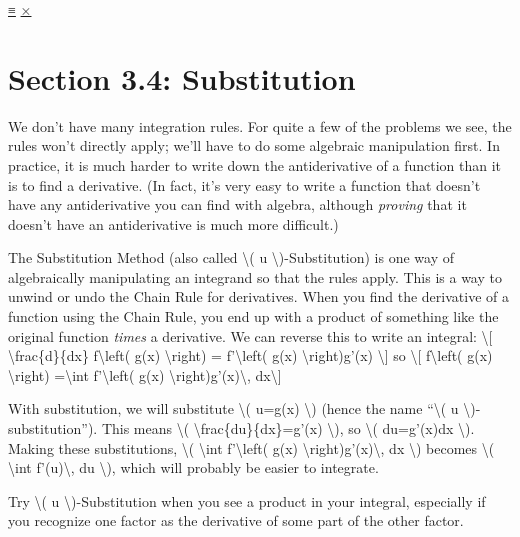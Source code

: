 \protect\hyperlink{main-nav}{≡} \protect\hyperlink{close-nav}{×}

\hypertarget{section-3.4-substitution}{%
\section{Section 3.4: Substitution}\label{section-3.4-substitution}}

We don't have many integration rules. For quite a few of the problems we
see, the rules won't directly apply; we'll have to do some algebraic
manipulation first. In practice, it is much harder to write down the
antiderivative of a function than it is to find a derivative. (In fact,
it's very easy to write a function that doesn't have any antiderivative
you can find with algebra, although \emph{proving} that it doesn't have
an antiderivative is much more difficult.)

The Substitution Method (also called \textbackslash{}( u
\textbackslash{})-Substitution) is one way of algebraically manipulating
an integrand so that the rules apply. This is a way to unwind or undo
the Chain Rule for derivatives. When you find the derivative of a
function using the Chain Rule, you end up with a product of something
like the original function \emph{times} a derivative. We can reverse
this to write an integral: \textbackslash{}{[}
\textbackslash{}frac\{d\}\{dx\} f\textbackslash{}left( g(x)
\textbackslash{}right) = f'\textbackslash{}left( g(x)
\textbackslash{}right)g'(x) \textbackslash{}{]} so \textbackslash{}{[}
f\textbackslash{}left( g(x) \textbackslash{}right) =\textbackslash{}int
f'\textbackslash{}left( g(x)
\textbackslash{}right)g'(x)\textbackslash{}, dx\textbackslash{}{]}

With substitution, we will substitute \textbackslash{}( u=g(x)
\textbackslash{}) (hence the name ``\textbackslash{}( u
\textbackslash{})-substitution''). This means \textbackslash{}(
\textbackslash{}frac\{du\}\{dx\}=g'(x) \textbackslash{}), so
\textbackslash{}( du=g'(x)dx \textbackslash{}). Making these
substitutions, \textbackslash{}( \textbackslash{}int
f'\textbackslash{}left( g(x)
\textbackslash{}right)g'(x)\textbackslash{}, dx \textbackslash{})
becomes \textbackslash{}( \textbackslash{}int f'(u)\textbackslash{}, du
\textbackslash{}), which will probably be easier to integrate.

Try \textbackslash{}( u \textbackslash{})-Substitution when you see a
product in your integral, especially if you recognize one factor as the
derivative of some part of the other factor.


